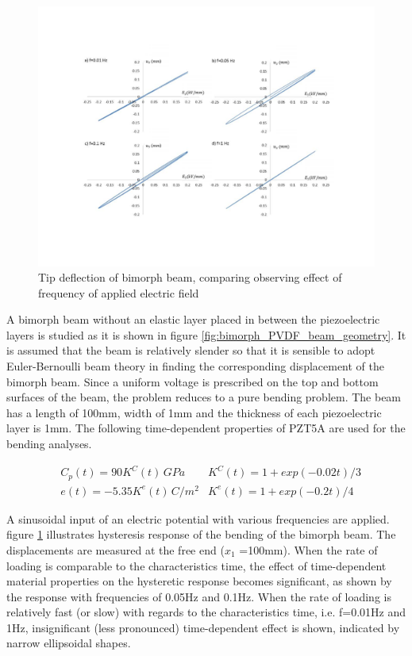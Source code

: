 \begin{figure}
\centering
\includegraphics[width=6.0in]{./chap_4_structural_analyses/pdf_beam/result_tip_deflection_of_bimorph_beam_frequencies.pdf}
\caption{Tip deflection of bimorph beam, comparing observing effect of frequency of applied electric field}
\label{fig:result_tip_deflection_of_bimorph_beam_frequency}
\end{figure}

A bimorph beam without an elastic layer placed in between the piezoelectric layers is studied as it is shown in figure \ref{fig:bimorph_PVDF_beam_geometry}.
It is assumed that the beam is relatively slender so that it is sensible to adopt Euler-Bernoulli beam theory in finding the corresponding displacement of the bimorph beam.
Since a uniform voltage is prescribed on the top and bottom surfaces of the beam, the problem reduces to a pure bending problem.
The beam has a length of 100mm, width of 1mm and the thickness of each piezoelectric layer is 1mm.
The following time-dependent properties of PZT5A are used for the bending analyses.

\begin{equation}
\begin{aligned}
& C_p(t)=90 K^C(t) \, {GPa}      &K^C(t)=1+exp(-0.02 t)/3 \\
& e(t)=-5.35 K^e(t) \, C/m^2 &K^e(t)=1+exp(-0.2 t)/4
\label{Eqn:beam_frequency_material_properties}
\end{aligned}
\end{equation}

A sinusoidal input of an electric potential with various frequencies are applied.
figure \ref{fig:result_tip_deflection_of_bimorph_beam_frequency} illustrates hysteresis response of the bending of the bimorph beam.
The displacements are measured at the free end ($x_1$ =100mm).
When the rate of loading is comparable to the characteristics time,
the effect of time-dependent material properties on the hysteretic response becomes significant,
as shown by the response with frequencies of 0.05Hz and 0.1Hz.
When the rate of loading is relatively fast (or slow) with regards to the characteristics time, i.e. f=0.01Hz and 1Hz,
 insignificant (less pronounced) time-dependent effect is shown, indicated by narrow ellipsoidal shapes.
 
